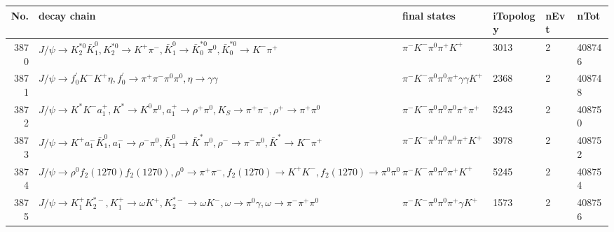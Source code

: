 \begin{table}[htbp] 
\begin{center}
\begin{small}
\begin{tabular}{rlllll}\hline\hline
 No. & decay chain & final states &  iTopology & nEvt & nTot \\\hline
3870&$J/\psi       \rightarrow K_2^{*0}       \bar{K}_1^{0} , K_2^{*0}        \rightarrow K^{+}          \pi^{-}        , \bar{K}_1^{0}  \rightarrow \bar{K}_0^{*0}\pi^{0}        , \bar{K}_0^{*0} \rightarrow K^{-}          \pi^{+}        $&$\pi^{-}        K^{-}          \pi^{0}        \pi^{+}        K^{+}          $& 3013&    2&408746\\
3871&$J/\psi       \rightarrow f^{'}_{0}     K^{-}          K^{+}          \eta          , f^{'}_{0}      \rightarrow \pi^{+}        \pi^{-}        \pi^{0}        \pi^{0}        , \eta           \rightarrow \gamma       \gamma       $&$\pi^{-}        K^{-}          \pi^{0}        \pi^{0}        \pi^{+}        \gamma       \gamma       K^{+}          $& 2368&    2&408748\\
3872&$J/\psi       \rightarrow K^{*}          K^{-}          a_{1}^{+}      , K^{*}           \rightarrow K^{0}          \pi^{0}        , a_{1}^{+}       \rightarrow \rho^{+}      \pi^{0}        , K_{S}           \rightarrow \pi^{+}        \pi^{-}        , \rho^{+}       \rightarrow \pi^{+}        \pi^{0}        $&$\pi^{-}        K^{-}          \pi^{0}        \pi^{0}        \pi^{0}        \pi^{+}        \pi^{+}        $& 5243&    2&408750\\
3873&$J/\psi       \rightarrow K^{+}          a_{1}^{-}      \bar{K}_1^{0} , a_{1}^{-}       \rightarrow \rho^{-}      \pi^{0}        , \bar{K}_1^{0}  \rightarrow \bar{K}^{*}   \pi^{0}        , \rho^{-}       \rightarrow \pi^{-}        \pi^{0}        , \bar{K}^{*}    \rightarrow K^{-}          \pi^{+}        $&$\pi^{-}        K^{-}          \pi^{0}        \pi^{0}        \pi^{0}        \pi^{+}        K^{+}          $& 3978&    2&408752\\
3874&$J/\psi       \rightarrow \rho^{0}      f_{2}(1270)    f_{2}(1270)    , \rho^{0}       \rightarrow \pi^{+}        \pi^{-}        , f_{2}(1270)     \rightarrow K^{+}          K^{-}          , f_{2}(1270)     \rightarrow \pi^{0}        \pi^{0}        $&$\pi^{-}        K^{-}          \pi^{0}        \pi^{0}        \pi^{+}        K^{+}          $& 5245&    2&408754\\
3875&$J/\psi       \rightarrow K_1^{+}        K_2^{*-}       , K_1^{+}         \rightarrow \omega         K^{+}          , K_2^{*-}        \rightarrow \omega         K^{-}          , \omega          \rightarrow \pi^{0}        \gamma       , \omega          \rightarrow \pi^{-}        \pi^{+}        \pi^{0}        $&$\pi^{-}        K^{-}          \pi^{0}        \pi^{0}        \pi^{+}        \gamma       K^{+}          $& 1573&    2&408756\\

\end{tabular}
\end{small}
\end{center}
\end{table}

